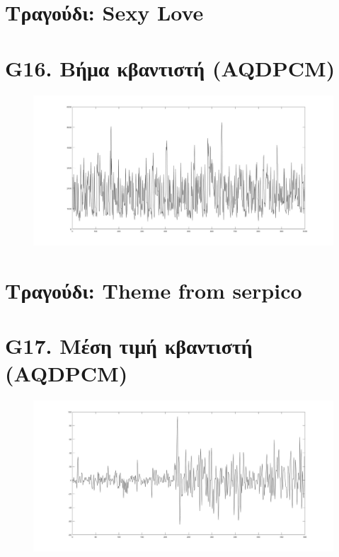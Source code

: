 \documentclass{article}
\begin{document}
\section*{Τραγούδι: Sexy Love}
\section*{G16. Βήμα κβαντιστή (AQDPCM) }
\begin{figure}[h!]
 \begin{center}
 \advance\leftskip-6cm
  \includegraphics[width=230mm,scale=0.7]{g16s1.jpg}
\end{center}
\end{figure}
\newpage
\section*{Τραγούδι: Theme from serpico}
\section*{G17. Μέση τιμή κβαντιστή (AQDPCM) }
\begin{figure}[h!]
 \begin{center}
 \advance\leftskip-6cm
  \includegraphics[width=230mm,scale=0.7]{g17s1.jpg}
\end{center}
\end{figure}
\newpage
\end{document}
